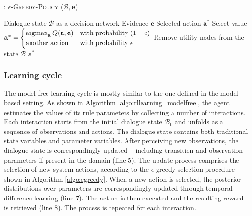 \begin{algorithm}[h!]
\caption{: \textsc{$\epsilon$-Greedy-Policy} ($\mathcal{B}, \mathbf{e}$)}
\begin{algorithmic}[1] \vspace{1mm}
\REQUIRE Dialogue state $\mathcal{B}$ as a decision network
\REQUIRE Evidence $\mathbf{e}$
\ENSURE Selected action $\mathbf{a}^*$
\STATE Select value $\mathbf{a}^* = \begin{cases} \argmax_{\mathbf{a}} Q(\mathbf{a}, \mathbf{e}) & \text{with probability } (1- \epsilon) \\ \text{another action} & \text{with probability } \epsilon \end{cases}$
\STATE Remove utility nodes from the state $\mathcal{B}$
\RETURN $\mathbf{a}^*$
\end{algorithmic}
\label{algo:egreedy}
\end{algorithm}

\subsubsection*{Learning cycle}

The model-free learning cycle is mostly similar to the one defined in the model-based setting.  As shown in Algorithm \ref{algo:rllearning_modelfree}, the agent estimates the values of its rule parameters by collecting a number of interactions.  Each interaction starts from the initial dialogue state $\mathcal{B}_0$ and unfolds as a sequence of observations and actions.  The dialogue state contains both traditional state variables and parameter variables.  After perceiving new observations, the dialogue state is correspondingly updated -- including transition and observation parameters if present in the domain (line 5).  The update process comprises the selection of new system actions, according to the $\epsilon$-greedy selection procedure shown in Algorithm \ref{algo:egreedy}. When a new action is selected, the posterior distributions over parameters are correspondingly updated through temporal-difference learning (line 7). The action is then executed and the resulting reward is retrieved (line 8).  The process is repeated for each interaction. 


